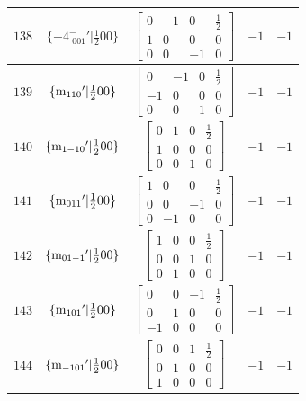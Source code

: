 \documentclass[fleqn,8pt]{jsarticle}
\begin{document}
\begin{longtable}{ccccc}
$ 138 $ & $ \{-4^{-}_{\,\,001}{}'|\frac{1}{2} 0 0\} $ & $ \begin{bmatrix} 0 & -1 & 0 & \frac{1}{2} \\ 1 & 0 & 0 & 0 \\ 0 & 0 & -1 & 0 \end{bmatrix} $ & $ -1 $ & $ -1 $ \\ \hline
$ 139 $ & $ \{{\rm m}_{110}{}'|\frac{1}{2} 0 0\} $ & $ \begin{bmatrix} 0 & -1 & 0 & \frac{1}{2} \\ -1 & 0 & 0 & 0 \\ 0 & 0 & 1 & 0 \end{bmatrix} $ & $ -1 $ & $ -1 $ \\ \hline
$ 140 $ & $ \{{\rm m}_{1-10}{}'|\frac{1}{2} 0 0\} $ & $ \begin{bmatrix} 0 & 1 & 0 & \frac{1}{2} \\ 1 & 0 & 0 & 0 \\ 0 & 0 & 1 & 0 \end{bmatrix} $ & $ -1 $ & $ -1 $ \\ \hline
$ 141 $ & $ \{{\rm m}_{011}{}'|\frac{1}{2} 0 0\} $ & $ \begin{bmatrix} 1 & 0 & 0 & \frac{1}{2} \\ 0 & 0 & -1 & 0 \\ 0 & -1 & 0 & 0 \end{bmatrix} $ & $ -1 $ & $ -1 $ \\ \hline
$ 142 $ & $ \{{\rm m}_{01-1}{}'|\frac{1}{2} 0 0\} $ & $ \begin{bmatrix} 1 & 0 & 0 & \frac{1}{2} \\ 0 & 0 & 1 & 0 \\ 0 & 1 & 0 & 0 \end{bmatrix} $ & $ -1 $ & $ -1 $ \\ \hline
$ 143 $ & $ \{{\rm m}_{101}{}'|\frac{1}{2} 0 0\} $ & $ \begin{bmatrix} 0 & 0 & -1 & \frac{1}{2} \\ 0 & 1 & 0 & 0 \\ -1 & 0 & 0 & 0 \end{bmatrix} $ & $ -1 $ & $ -1 $ \\ \hline
$ 144 $ & $ \{{\rm m}_{-101}{}'|\frac{1}{2} 0 0\} $ & $ \begin{bmatrix} 0 & 0 & 1 & \frac{1}{2} \\ 0 & 1 & 0 & 0 \\ 1 & 0 & 0 & 0 \end{bmatrix} $ & $ -1 $ & $ -1 $ \\ \hline

\end{longtable}
\end{document}
